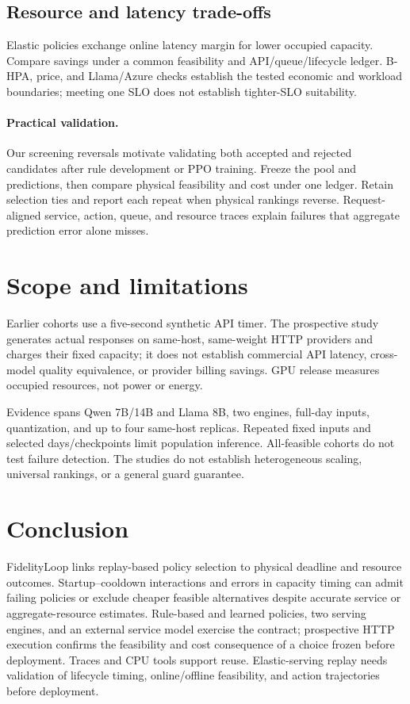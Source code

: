 \subsection{Resource and latency trade-offs}
Elastic policies exchange online latency margin for lower occupied capacity.
Compare savings under a common feasibility and API/queue/lifecycle ledger.
B-HPA, price, and Llama/Azure checks establish the tested economic and workload
boundaries; meeting one SLO does not establish tighter-SLO suitability.


\paragraph{Practical validation.}
Our screening reversals motivate validating both accepted and rejected
candidates after rule development or PPO training. Freeze the pool and
predictions, then compare physical feasibility and cost under one ledger.
Retain selection ties and report each repeat when physical rankings reverse.
Request-aligned service, action, queue, and resource traces explain failures
that aggregate prediction error alone misses.

\section{Scope and limitations}
Earlier cohorts use a five-second synthetic API timer. The prospective
study generates actual responses on same-host, same-weight HTTP providers
and charges their fixed capacity; it does not establish commercial API
latency, cross-model quality equivalence, or provider billing savings. GPU
release measures occupied resources, not power or energy.

Evidence spans Qwen 7B/14B and Llama 8B, two engines, full-day inputs,
quantization, and up to four same-host replicas. Repeated fixed inputs and
selected days/checkpoints limit population inference. All-feasible cohorts
do not test failure detection. The studies do not establish heterogeneous
scaling, universal rankings, or a general guard guarantee.

\section{Conclusion}
FidelityLoop links replay-based policy selection to physical deadline and
resource outcomes. Startup--cooldown interactions and errors in capacity timing can
admit failing policies or exclude cheaper feasible alternatives despite accurate
service or aggregate-resource estimates. Rule-based and learned policies,
two serving engines, and an external service model exercise the contract;
prospective HTTP execution confirms the feasibility and cost consequence of
a choice frozen before deployment. Traces and CPU tools support reuse.
Elastic-serving replay needs validation
of lifecycle timing, online/offline feasibility, and action trajectories
before deployment.
